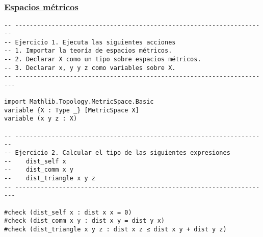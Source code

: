 \subsubsection{\href{./src/Basicos/Espacios\_metricos.lean}{Espacios métricos}}
\label{sec:org5a6db24}
\begin{verbatim}
-- ---------------------------------------------------------------------
-- Ejercicio 1. Ejecuta las siguientes acciones
-- 1. Importar la teoría de espacios métricos.
-- 2. Declarar X como un tipo sobre espacios métricos.
-- 3. Declarar x, y y z como variables sobre X.
-- ----------------------------------------------------------------------

import Mathlib.Topology.MetricSpace.Basic
variable {X : Type _} [MetricSpace X]
variable (x y z : X)

-- ---------------------------------------------------------------------
-- Ejercicio 2. Calcular el tipo de las siguientes expresiones
--    dist_self x
--    dist_comm x y
--    dist_triangle x y z
-- ----------------------------------------------------------------------

#check (dist_self x : dist x x = 0)
#check (dist_comm x y : dist x y = dist y x)
#check (dist_triangle x y z : dist x z ≤ dist x y + dist y z)
\end{verbatim}

